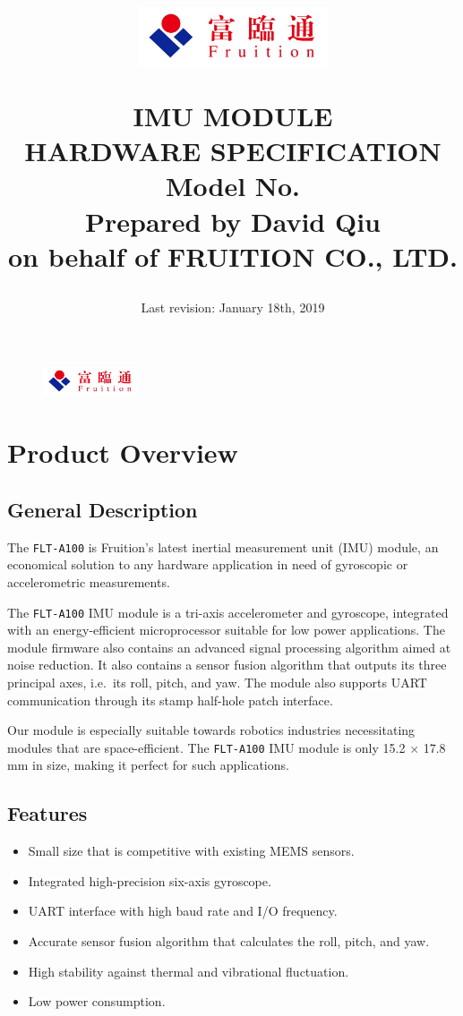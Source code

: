 \documentclass{scrreprt}
\title{
	\begin{figure}[H]
		\centering\includegraphics[width=0.5\textwidth]{logo.jpeg}
	\end{figure}
	\vspace{1cm}
	\flushright
	\Huge{IMU MODULE}\\
	\Huge{HARDWARE SPECIFICATION}\\
	\vspace{2cm}
	\huge{Model No. \modelno}\\
	\vspace{2cm}
	\LARGE{Prepared by David Qiu \\ on behalf of FRUITION CO., LTD.}
}
\date{
	Last revision: January 18th, 2019\\
}
\newcommand{\pchapter}[1]{
	\begingroup\let\clearpage\relax
	\newpage
	\begin{figure}[H]
		\includegraphics[width=0.25\textwidth]{logo.jpeg}
	\end{figure}
	\chapter{#1}
	\endgroup
}
\newcommand{\modelno}{%
	\texttt{FLT-A100}
}
\newcommand{\x}{
	$\times$
}
\begin{document}
\begin{CJK*}{UTF8}{gbsn}
\maketitle
\tableofcontents

\pchapter{Product Overview}
\section{General Description}
The \modelno is Fruition's latest inertial measurement unit (IMU) module, an
economical solution to any hardware application in need of gyroscopic or
accelerometric measurements.

The \modelno IMU module is a tri-axis accelerometer and gyroscope, integrated
with an energy-efficient microprocessor suitable for low power applications. The
module firmware also contains an advanced signal processing algorithm aimed at
noise reduction. It also contains a sensor fusion algorithm that outputs its
three principal axes, i.e.\ its roll, pitch, and yaw. The module also supports
UART communication through its stamp half-hole patch interface.

Our module is especially suitable towards robotics industries necessitating
modules that are space-efficient. The \modelno IMU module is only
15.2\x17.8 mm in size, making it perfect for such applications.

\section{Features}
\begin{itemize}
\item Small size that is competitive with existing MEMS sensors.

\item Integrated high-precision six-axis gyroscope.

\item UART interface with high baud rate and I/O frequency.

\item Accurate sensor fusion algorithm that calculates the roll, pitch, and yaw.

\item High stability against thermal and vibrational fluctuation.

\item Low power consumption.
\end{itemize}


\end{CJK*}
\end{document}
